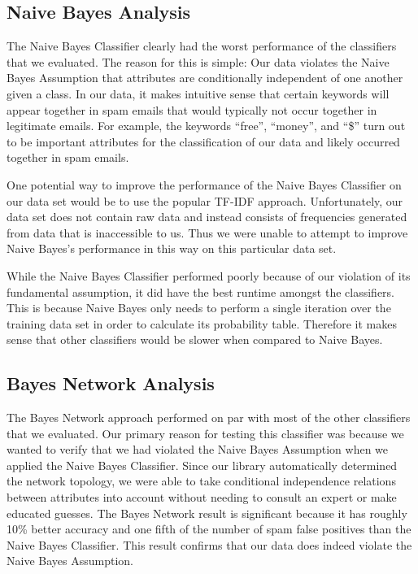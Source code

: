 \documentclass[11pt,oneside,reqno]{amsart}
\theoremstyle{definition}
\theoremstyle{definition}
\theoremstyle{remark}
\numberwithin{equation}{section}
\numberwithin{equation}{section}
\begin{document}
\subsection{Naive Bayes Analysis}
The Naive Bayes Classifier clearly had the worst performance of the classifiers that we evaluated. The reason for this is simple: Our data violates the Naive Bayes Assumption that attributes are conditionally independent of one another given a class. In our data, it makes intuitive sense that certain keywords will appear together in spam emails that would typically not occur together in legitimate emails. For example, the keywords ``free'', ``money'', and ``\$'' turn out to be important attributes for the classification of our data and likely occurred together in spam emails. 

One potential way to improve the performance of the Naive Bayes Classifier on our data set would be to use the popular TF-IDF approach. Unfortunately, our data set does not contain raw data and instead consists of frequencies generated from data that is inaccessible to us. Thus we were unable to attempt to improve Naive Bayes's performance in this way on this particular data set.

While the Naive Bayes Classifier performed poorly because of our violation of its fundamental assumption, it did have the best runtime amongst the classifiers. This is because Naive Bayes only needs to perform a single iteration over the training data set in order to calculate its probability table. Therefore it makes sense that other classifiers would be slower when compared to Naive Bayes.

\subsection{Bayes Network Analysis}
The Bayes Network approach performed on par with most of the other classifiers that we evaluated. Our primary reason for testing this classifier was because we wanted to verify that we had violated the Naive Bayes Assumption when we applied the Naive Bayes Classifier. Since our library automatically determined the network topology, we were able to take conditional independence relations between attributes into account without needing to consult an expert or make educated guesses. The Bayes Network result is significant because it has roughly 10\% better accuracy and one fifth of the number of spam false positives than the Naive Bayes Classifier. This result confirms that our data does indeed violate the Naive Bayes Assumption.
\end{document}
